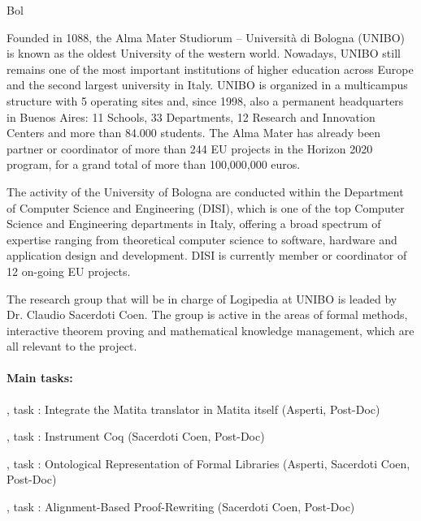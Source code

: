 \begin{sitedescription}{Bol}


Founded in 1088, the Alma Mater Studiorum – Università di Bologna (UNIBO) is known as the oldest University of the western world. Nowadays, UNIBO still remains one of the most important institutions of higher education across Europe and the second largest university in Italy. UNIBO is organized in a multicampus structure with 5 operating sites and, since 1998, also a permanent headquarters in Buenos Aires: 11 Schools, 33 Departments, 12 Research and Innovation Centers and more than 84.000 students. The Alma Mater has already been partner or coordinator of more than 244 EU projects in the Horizon 2020 program, for a grand total of more than 100,000,000 euros.

The activity of the University of Bologna are conducted within the Department of Computer Science and Engineering (DISI), which is one of the top Computer Science and Engineering departments in Italy, offering a broad spectrum of expertise ranging from theoretical computer science to software, hardware and application design and development. DISI is currently member or coordinator of 12 on-going EU projects.

The research group that will be in charge of Logipedia at UNIBO is leaded by Dr. Claudio Sacerdoti Coen. The group is active in the areas of formal methods, interactive theorem proving and mathematical knowledge management, which are all relevant to the project.

\paragraph*{Main tasks:}

\begin{compactitem}
\item {}, task : Integrate the Matita translator in Matita itself (Asperti, Post-Doc)
\item {}, task : Instrument Coq (Sacerdoti Coen, Post-Doc)
\item {}, task : Ontological Representation of Formal Libraries (Asperti, Sacerdoti Coen, Post-Doc)
\item {}, task : Alignment-Based  Proof-Rewriting (Sacerdoti Coen, Post-Doc)
\end{compactitem}


\end{sitedescription}
